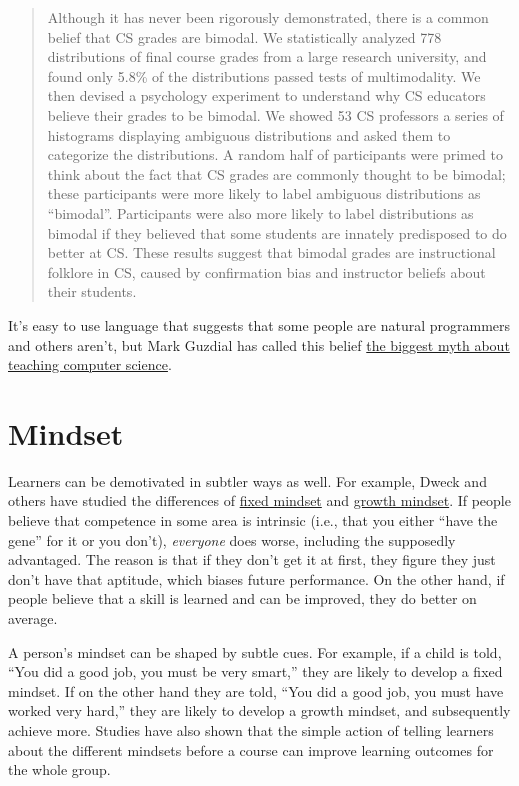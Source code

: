 \documentclass[10pt,statementpaper]{memoir}
\begin{document}
\begin{quote}
Although it has never been rigorously demonstrated, there is a common
belief that CS grades are bimodal. We statistically analyzed 778
distributions of final course grades from a large research university,
and found only 5.8\% of the distributions passed tests of multimodality.
We then devised a psychology experiment to understand why CS educators
believe their grades to be bimodal. We showed 53 CS professors a series
of histograms displaying ambiguous distributions and asked them to
categorize the distributions. A random half of participants were primed
to think about the fact that CS grades are commonly thought to be
bimodal; these participants were more likely to label ambiguous
distributions as ``bimodal''. Participants were also more likely to
label distributions as bimodal if they believed that some students are
innately predisposed to do better at CS. These results suggest that
bimodal grades are instructional folklore in CS, caused by confirmation
bias and instructor beliefs about their students.
\end{quote}

It's easy to use language that suggests that some people are natural
programmers and others aren't, but Mark Guzdial has called this belief
\href{http://cacm.acm.org/blogs/blog-cacm/189498-top-10-myths-about-teaching-computer-science/fulltext}{the
biggest myth about teaching computer science}.

\section{Mindset}\label{mindset}

Learners can be demotivated in subtler ways as well. For example, Dweck
and others have studied the differences of
\href{gloss.html\#fixed-mindset}{fixed mindset} and
\href{gloss.html\#growth-mindset}{growth mindset}. If people believe
that competence in some area is intrinsic (i.e., that you either ``have
the gene'' for it or you don't), \emph{everyone} does worse, including
the supposedly advantaged. The reason is that if they don't get it at
first, they figure they just don't have that aptitude, which biases
future performance. On the other hand, if people believe that a skill is
learned and can be improved, they do better on average.

A person's mindset can be shaped by subtle cues. For example, if a child
is told, ``You did a good job, you must be very smart,'' they are likely
to develop a fixed mindset. If on the other hand they are told, ``You
did a good job, you must have worked very hard,'' they are likely to
develop a growth mindset, and subsequently achieve more. Studies have
also shown that the simple action of telling learners about the
different mindsets before a course can improve learning outcomes for the
whole group.
\end{document}

